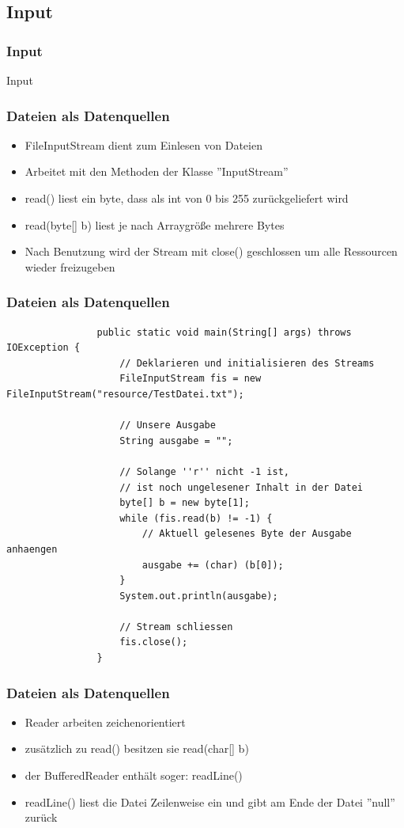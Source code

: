 \subsection{Input}
\begin{frame}[fragile]
	\frametitle{Input}
	\huge Input
\end{frame}

\begin{frame}[fragile]
\frametitle{Dateien als Datenquellen}
	\begin{itemize}
	  \item FileInputStream dient zum Einlesen von Dateien
	  \item Arbeitet mit den Methoden der Klasse ''InputStream''
	  \item read() liest ein byte, dass als int von 0 bis 255 zurückgeliefert wird
	  \item read(byte[] b) liest je nach Arraygröße mehrere Bytes
	  \item Nach Benutzung wird der Stream mit close() geschlossen um alle
	  Ressourcen wieder freizugeben
	\end{itemize}
\end{frame}

\begin{frame}[fragile]
\frametitle{Dateien als Datenquellen}
			\begin{lstlisting}
				public static void main(String[] args) throws IOException {
					// Deklarieren und initialisieren des Streams
					FileInputStream fis = new FileInputStream("resource/TestDatei.txt");
			
					// Unsere Ausgabe
					String ausgabe = "";
			
					// Solange ''r'' nicht -1 ist,
					// ist noch ungelesener Inhalt in der Datei
					byte[] b = new byte[1];
					while (fis.read(b) != -1) {
						// Aktuell gelesenes Byte der Ausgabe anhaengen
						ausgabe += (char) (b[0]);
					}
					System.out.println(ausgabe);
			
					// Stream schliessen
					fis.close();
				}
			\end{lstlisting}
\end{frame}

\begin{frame}[fragile]
\frametitle{Dateien als Datenquellen}
	\begin{itemize}
	  \item Reader arbeiten zeichenorientiert
	  \item zusätzlich zu read() besitzen sie read(char[] b) 
	  \item der BufferedReader enthält soger: readLine()
	  \item readLine() liest die Datei Zeilenweise ein und gibt am Ende der Datei
	  ''null'' zurück
	\end{itemize}
\end{frame}

